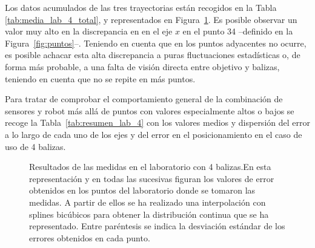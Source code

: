 Los datos acumulados de las tres trayectorias están recogidos en la Tabla \ref{tab:media_lab_4_total}, y representados en Figura~\ref{fig:res_lab}.
Es posible observar un valor muy alto en la discrepancia en en el eje $x$ en el punto 34 --definido en la Figura~\ref{fig:puntos}--.
Teniendo en cuenta que en los puntos adyacentes no ocurre, es posible achacar esta alta discrepancia a puras fluctuaciones estadísticas o, de forma más probable, a una falta de visión directa entre objetivo y balizas, teniendo en cuenta que no se repite en más puntos.

Para tratar de comprobar el comportamiento general de la combinación de sensores y robot más allá de puntos con valores especialmente altos o bajos se recoge la Tabla~\ref{tab:resumen_lab_4} con los valores medios y dispersión del error a lo largo de cada uno de los ejes y del error en el posicionamiento en el caso de uso de 4 balizas.

\begin{figure}[H]
    \centering
    \hspace*{-0.5cm}
    
    \captionsetup{justification=justified}
    \caption{Resultados de las medidas en el laboratorio con 4 balizas.\newline En esta representación y en todas las sucesivas figuran los valores de error obtenidos en los puntos del laboratorio donde se tomaron las medidas. A partir de ellos se ha realizado una interpolación con splines bicúbicos para obtener la distribución continua que se ha representado. \newline Entre paréntesis se indica la desviación estándar de los errores obtenidos en cada punto.}
    \label{fig:res_lab}
\end{figure}


